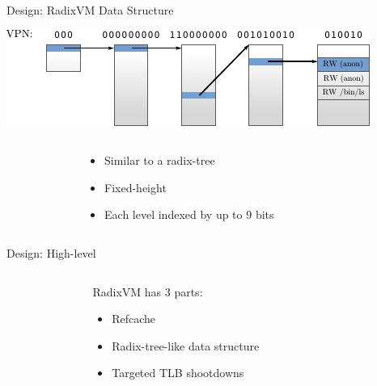 \documentclass[aspectratio=169]{beamer}
\newcommand{\bi}{\begin{itemize}}
\newcommand{\ei}{\end{itemize}}
\begin{document}
\begin{frame}{Design: RadixVM Data Structure}
  \begin{center}
  \includegraphics[scale=1.5]{./figures/radix.pdf}
  \end{center}
  \begin{columns}[T]
    \begin{column}{0.2\textwidth}
    \end{column}
    \begin{column}{0.6\textwidth}
      \bi
    \item Similar to a radix-tree
    \item Fixed-height
    \item Each level indexed by up to 9 bits
      \ei
    \end{column}
    \begin{column}{0.2\textwidth}
    \end{column}
  \end{columns}
\end{frame}

\begin{frame}{Design: High-level}
  \begin{columns}[T]
    \begin{column}{0.3\textwidth}
    \end{column}
    \begin{column}{0.4\textwidth}
      RadixVM has 3 parts:
      \bi
    \item Refcache
    \item Radix-tree-like data structure
    \item {Targeted TLB shootdowns}
      \ei
    \end{column}
    \begin{column}{0.3\textwidth}
    \end{column}
  \end{columns}
\end{frame}
\end{document}

